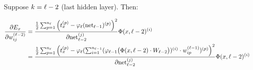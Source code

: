
Suppose $k = {\ell} - 2$ (last hidden layer). Then:

\begin{align}
    \frac{\partial E_x}{\partial w_{ij}^{({\ell}-2)}} &= \frac{\frac{1}{2} \sum_{p=1}^{n_{\ell}} \left ( t_x^{(p)} -\varphi_{{\ell}}(\mathrm{net}_{{\ell}-1})^{(p)} \right )^2}{\partial \mathrm{net}_{{\ell}-2}^{(j)}} \Phi(x, {\ell}-2)^{(i)}\\
    &= \frac{\frac{1}{2} \sum_{p=1}^{n_{\ell}} \left ( t_x^{(p)} -\varphi_{{\ell}}(\sum_{i=1}^{n_{{\ell}-1}} (
        \varphi_{{\ell}-1} \big (\Phi(x, {\ell}-2) \cdot W_{{\ell}-2} \big)
    )^{(i)} \cdot w_{ip}^{({\ell}-1)})^{(p)} \right )^2}{\partial \mathrm{net}_{{\ell}-2}^{(j)}} \Phi(x, {\ell}-2)^{(i)}\\
\end{align}